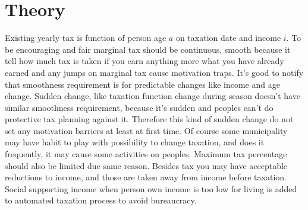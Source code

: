 %
%
%
\begin{comment}\end{comment}
\chapter{Theory}
\label{theory}
Existing yearly tax is function of person age $a$ on taxation date and income $i$.
To be encouraging and fair marginal tax should be continuous,
smooth because it tell how much tax is taken if you earn anything more what you have already earned
and any jumps on marginal tax cause motivation traps.
It's good to notify that smoothness requirement is for predictable changes like income and age chan\-ge.
Sudden change, like taxation function change during season doesn't have similar smoothness requirement,
because it's sudden and peoples can't do protective tax planning against it.
Therefore this kind of sudden change do not set any motivation barriers at least at first time.
Of course some municipality may have habit to play with possibility to change taxation,
and does it frequently, it may cause some activities on peoples.
Maximum tax percentage should also be limited due same reason.
Besides tax you may have acceptable reductions to income,
and those are taken away from income before taxation.
Social supporting income when person own income is too low for living is added to
automated taxation process to avoid bureaucracy.
